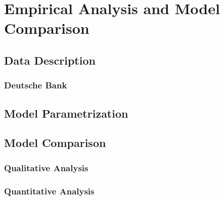\chapter{Empirical Analysis and Model Comparison}

\section{Data Description}

\subsection{Deutsche Bank}

\section{Model Parametrization}

\section{Model Comparison}

\subsection{Qualitative Analysis}

\subsection{Quantitative Analysis}